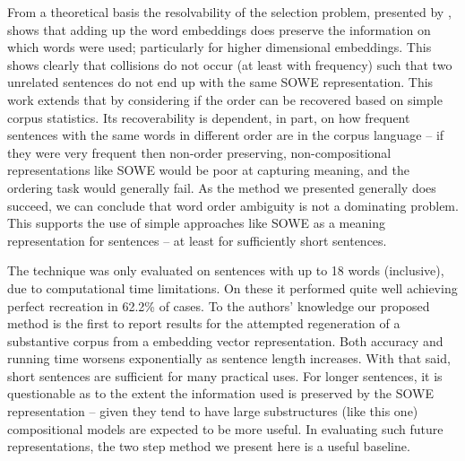 \documentclass[compsoc]{IEEEtran}
\theoremstyle{plain}
\theoremstyle{definition}
\begin{document}
From a theoretical basis the resolvability of the selection problem, presented by \textcite{White2015BOWgen}, shows that adding up the word embeddings does preserve the information on which words were used; particularly for higher dimensional embeddings. This shows clearly that collisions do not occur (at least with frequency) such that two unrelated sentences do not end up with the same SOWE representation. 
This work extends that by considering if the order can be recovered based on simple corpus statistics. Its recoverability is dependent, in part, on how frequent sentences with the same words in different order are in the corpus language -- if they were very frequent then non-order preserving, non-compositional representations like SOWE would be poor at capturing meaning, and the ordering task would generally fail. As the method we presented generally does succeed, we can conclude that word order ambiguity is not a dominating problem. This supports the use of simple approaches like SOWE as a meaning representation for sentences -- at least for sufficiently short sentences.

The technique was only evaluated on sentences with up to 18 words (inclusive), due to computational time limitations. On these it performed quite well achieving perfect recreation in 62.2\% of cases. To the authors' knowledge our proposed method is the first to report results for the attempted regeneration of a substantive corpus from a embedding vector representation. Both accuracy and running time worsens exponentially as sentence length increases. With that said, short sentences are sufficient for many practical uses. For longer sentences, it is questionable as to the extent the information used is preserved by the SOWE representation -- given they tend to have large substructures (like this one) compositional models are expected to be more useful. In evaluating such future representations, the two step method we present here is a useful baseline.

%
\printbibliography
\end{document}
